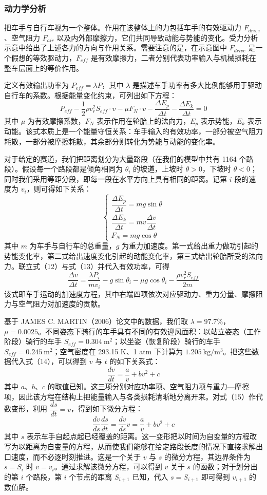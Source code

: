 \documentclass[11pt,a4paper]{ctexart}
\begin{document}
\subsubsection{动力学分析}

把车手与自行车视为一个整体。作用在该整体上的力包括车手的有效驱动力 $F_{drive}$、空气阻力 $F_{air}$ 以及内外部摩擦力，它们共同导致动能与势能的变化。受力分析示意中给出了上述各力的方向与作用关系。需要注意的是，在示意图中 $F_{drive}$ 是一个假想的等效驱动力，$F_{eff}$ 是有效摩擦力，二者分别代表功率输入与机械损耗在整车层面上的等价作用。

定义有效输出功率为 $P_{eff}=\lambda P$，其中 $\lambda$ 是描述车手功率有多大比例能够用于驱动自行车的系数。根据能量变化约束，可列出如下方程：
\[
P_{eff}-\frac{1}{2}\rho v_r^2 S_{eff}\cdot v-\mu F_N\cdot v-\frac{\Delta E_p}{\Delta t}-\frac{\Delta E_k}{\Delta t}=0
\]
其中 $\mu$ 为有效摩擦系数，$F_N$ 表示作用在轮胎上的法向力，$E_p$ 表示势能，$E_k$ 表示动能。该式本质上是一个能量守恒关系：车手输入的有效功率，一部分被空气阻力耗散，一部分被摩擦耗散，其余部分则转化为势能与动能的变化率。

对于给定的赛道，我们把距离划分为大量路段（在我们的模型中共有 1164 个路段）。假设每一个路段都是倾角相同为 $\theta_i$ 的坡道，上坡时 $\theta>0$，下坡时 $\theta<0$；同时我们采用等距分段，即每一段在水平方向上具有相同的距离。记第 $i$ 段的速度为 $v_i$，则可得如下关系：
\[
\begin{cases}
\dfrac{\Delta E_p}{\Delta t}=mg\sin\theta\\[0.6em]
\dfrac{\Delta E_k}{\Delta t}=mv\dfrac{\Delta v}{\Delta t}\\[0.6em]
F_N=mg\cos\theta
\end{cases}
\]
其中 $m$ 为车手与自行车的总重量，$g$ 为重力加速度。第一式给出重力做功引起的势能变化率，第二式给出速度变化引起的动能变化率，第三式给出轮胎所受的法向力。联立式（12）与式（13）并代入有效功率，可得
\[
\frac{\Delta v}{\Delta t}=\frac{\lambda P_i}{mv_i}-g\sin\theta_i-\mu g\cos\theta_i-\frac{\rho v_r^2 S_{eff}}{2m}
\]
该式即车手运动的加速度方程，其中右端四项依次对应驱动力、重力分量、摩擦阻力与空气阻力对加速度的贡献。

基于 JAMES C. MARTIN（2006）论文中的数据，我们取 $\lambda=97.7\%$，$\mu=0.0025$。不同姿态下骑行的车手具有不同的有效迎风面积：以站立姿态（工作阶段）骑行的车手 $S_{eff}=0.304\ \mathrm{m^2}$；以坐姿（恢复阶段）骑行的车手 $S_{eff}=0.245\ \mathrm{m^2}$；空气密度在 293.15 K、1 atm 下计算为 $1.205\ \mathrm{kg/m^3}$。把这些数据代入式（14），可以得到 $v$ 与 $t$ 的如下关系式：
\[
\frac{dv}{dt}=\frac{a}{v}+bv^2+c
\]
其中 $a$、$b$、$c$ 的取值已知。这三项分别对应功率项、空气阻力项与重力—摩擦项，因此该方程在结构上把能量输入与各类损耗清晰地分离开来。对式（15）作代数变形，利用 $\dfrac{ds}{dt}=v$，得到如下微分方程：
\[
\frac{dv}{ds}\frac{ds}{dt}=\frac{dv}{ds}v=\frac{a}{v}+bv^2+c
\]
其中 $s$ 表示车手自起点起已经覆盖的距离。这一变形把以时间为自变量的方程改写为以距离为自变量的方程，从而使我们能够在给定路段长度的情况下直接求解出口速度，而不必逐时刻推进。这是一个关于 $v$ 与 $s$ 的微分方程，其边界条件为 $s=S_i$ 时 $v=v_i$。通过求解该微分方程，可以得到 $v$ 关于 $s$ 的函数；对于划分出的第 $i$ 个路段，第 $i$ 个节点的距离 $S_{i+1}$ 已知，代入 $s=S_{i+1}$ 即可得到 $v_{i+1}$ 的数值解。
\end{document}
